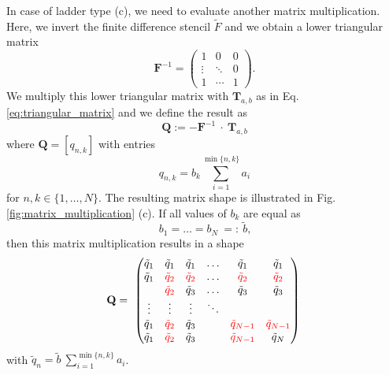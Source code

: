 \documentclass[a4paper, 10pt, twoside, twocolumn]{scrartcl}
\begin{document}
In case of ladder type (c), we need to evaluate another matrix multiplication. Here, we invert the finite difference stencil $\tilde{F}$ and we obtain a lower triangular matrix
\begin{equation*}
	\mathbf{F}^{-1} =
	\begin{pmatrix}
		1 & 0  &  0\\
		\vdots 	& \ddots &  0 \\
		1 &	\cdots	 &     1 
	\end{pmatrix} \text{.}
\end{equation*}
We multiply this lower triangular matrix with $\mathbf{T}_{a,b}$ as in Eq. \eqref{eq:triangular_matrix} and we define the result as 
\begin{equation}
	\mathbf{Q} := - \mathbf{F}^{-1} ~\cdot~ \mathbf{T}_{a,b}
\end{equation}
where $\mathbf{Q} = [q_{n,k}]$ with entries
\begin{equation}
	q_{n,k} = b_{k} \sum_{i=1}^{\min\{n,k\}} a_{i}
\end{equation}
for $n,k \in \{1,\ldots,N\}$. The resulting matrix shape is illustrated in Fig. \ref{fig:matrix_multiplication} (c). If all values of $b_{k}$ are equal as
\begin{equation}
b_{1}=\ldots=b_{N}~=:~\tilde{b}	\text{,}
\end{equation}
then this matrix multiplication results in a shape
\begin{equation*}
	\mathbf{Q} =~ 
	\def\aa{\color{red}\tilde{q}_{2}}
	\def\ab{\color{red}\tilde{q}_{N-1}}
	\begin{pmatrix}
		\tilde{q}_{1} & \tilde{q}_{1} & \tilde{q}_{1} & \ldots & \tilde{q}_{1} & \tilde{q}_{1} \\
		\tilde{q}_{1} & \aa & \aa & \ldots & \aa & \aa \\
		& \aa & \tilde{q}_{3} & \ldots & \tilde{q}_{3} & \tilde{q}_{3} \\
		\vdots     & \vdots & \vdots & \ddots \\
		\tilde{q}_{1}& \aa & \tilde{q}_{3} & & \ab & \ab \\
		\tilde{q}_{1} & \aa & \tilde{q}_{3} & & \ab & \tilde{q}_{N}
	\end{pmatrix} \\
\end{equation*}
with $\tilde{q}_{n} = \tilde{b} ~ \sum_{i=1}^{\min\{n,k\}} a_{i}$.
\end{document}
